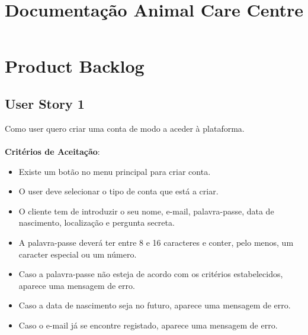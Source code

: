 \documentclass[a4paper,11pt]{article}
\title{Documentação Animal Care Centre}
\author{}
\date{}
\begin{document}
\maketitle
\vspace{-67pt}

\section{Product Backlog}
\subsection{User Story 1}
Como user quero criar uma conta de modo a aceder à plataforma.\\\\
\textbf{Critérios de Aceitação}:
\begin{itemize}
  \item Existe um botão no menu principal para criar conta.
  \item O user deve selecionar o tipo de conta que está a criar.
  \item O cliente tem de introduzir o seu nome, e-mail, palavra-passe, data de nascimento, localização e pergunta secreta.
  \item A palavra-passe deverá ter entre 8 e 16 caracteres e conter, pelo menos, um caracter especial ou um número.
  \item Caso a palavra-passe não esteja de acordo com os critérios estabelecidos, aparece uma mensagem de erro.
  \item Caso a data de nascimento seja no futuro, aparece uma mensagem de erro.
  \item Caso o e-mail já se encontre registado, aparece uma mensagem de erro.
\end{itemize}
\end{document}

